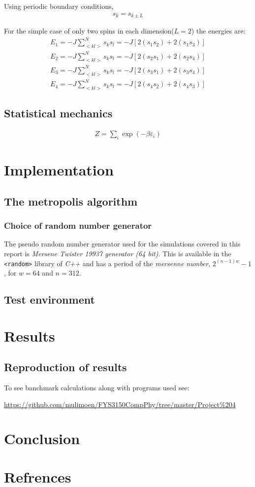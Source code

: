 \documentclass[11pt,a4paper,english,final]{article}
\numberwithin{equation}{section}
\begin{document}
Using periodic boundary conditions,
\begin{gather}
s_k = s_{k \pm L}
\end{gather}

For the simple case of only two spins in each dimension($L=2$) the energies are:
\begin{align*}
E_1 = -J\sum_{<kl>}^{N}s_k s_l = -J[2(s_1 s_2)+2(s_1 s_3)] \\
E_2 = -J\sum_{<kl>}^{N}s_k s_l = -J[2(s_2 s_1)+2(s_2 s_4)] \\
E_3 = -J\sum_{<kl>}^{N}s_k s_l = -J[2(s_3 s_1)+2(s_3 s_4)] \\
E_4 = -J\sum_{<kl>}^{N}s_k s_l = -J[2(s_4 s_2)+2(s_4 s_3)] 
\end{align*}


\subsection{Statistical mechanics}
\begin{gather}
Z = \sum_i \exp(-\beta\varepsilon_i)
\end{gather}

\section{Implementation}

\subsection{The metropolis algorithm}

\subsubsection{Choice of random number generator}
The pseudo random number generator used for the simulations covered in this report is \emph{Mersene Twister 19937 generator (64 bit)}. This is available in the \texttt{<random>} library of \emph{C++} and has a period of the \emph{mersenne number}, $2^{(n-1)w}-1$, for $w=64$ and $n=312$.	

\subsection{Test environment}

\section{Results}

\subsection{Reproduction of results}

To see banchmark calculations along with programs used see:

\url{https://github.com/mulimoen/FYS3150CompPhy/tree/master/Project\%204}


\section{Conclusion}

\section{Refrences}
\end{document}
